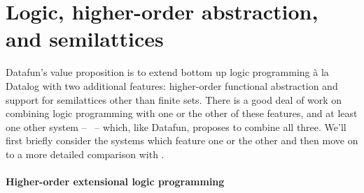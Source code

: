 

\section{Logic, higher-order abstraction, and semilattices}
\label{section-datafun-relatives}

Datafun's value proposition is to extend bottom up logic programming \`a la Datalog with two additional features: higher-order functional abstraction and support for semilattices other than finite sets. 
There is a good deal of work on combining logic programming with one or the other of these features, and at least one other system -- \flix\ -- which, like Datafun, proposes to combine all three.
%
We'll first briefly consider the systems which feature one or the other and then move on to a more detailed comparison with \flix.



\paragraph{Higher-order extensional logic programming}

